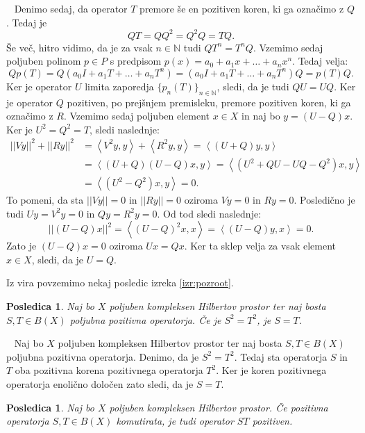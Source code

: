 \documentclass[12pt,a4paper,oneside,fleqn,openany]{book}
\newtheorem{posledica}[izrek]{Posledica}
\newcommand{\eopf}{\raisebox{0.8ex}{\framebox{}}} %
\newenvironment{dokaz}%
{\noindent{\bf Dokaz.}\ }%
{\hfill\eopf\par\bigskip}%
\newcommand{\N}{\mathbb{N}}
\newcommand{\abs}[1]{\ensuremath{\lvert #1 \rvert}}
\newcommand{\norm}[1]{\abs{\abs{#1}}}
\newcommand{\Sp}[2]{\ensuremath{\left<#1, #2\right>}}
\begin{document}
\begin{dokaz}
	Denimo sedaj, da operator $T$ premore še en pozitiven koren, ki ga označimo z $Q$. Tedaj je $$QT = QQ^2 = Q^2Q = TQ.$$ Še več, hitro vidimo, da je za vsak $n\in\N$ tudi $QT^n = T^nQ$. Vzemimo sedaj poljuben polinom $p\in P$ s predpisom $p(x) = a_0 + a_1x + \ldots + a_nx^n$. Tedaj velja: $$Qp(T) = Q(a_0I + a_1T + \ldots + a_nT^n) = (a_0I + a_1T + \ldots + a_nT^n)Q = p(T)Q.$$ Ker je operator $U$ limita zaporedja $\{p_n(T)\}_{n\in\N}$, sledi, da je tudi $QU = UQ$. Ker je operator $Q$ pozitiven, po prejšnjem premisleku, premore pozitiven koren, ki ga označimo z $R$. Vzemimo sedaj poljuben element $x\in X$ in naj bo $y = (U-Q)x$. Ker je $U^2 = Q^2 = T$, sledi naslednje: \begin{align*}
		\norm{Vy}^2 + \norm{Ry}^2 &= \Sp{V^2y}{y} + \Sp{R^2y}{y} = \Sp{(U+Q)y}{y} \\
		&= \Sp{(U + Q)(U-Q)x}{y} = \Sp{(U^2 + QU - UQ - Q^2)x}{y} \\
		&= \Sp{(U^2 - Q^2)x}{y} = 0.
	\end{align*}
	To pomeni, da sta $\norm{Vy}=0$ in $\norm{Ry}=0$ oziroma $Vy = 0$ in $Ry = 0$. Posledično je tudi $Uy = V^2y = 0$ in $Qy = R^2y = 0$. Od tod sledi naslednje: $$\norm{(U-Q)x}^2=\Sp{(U-Q)^2x}{x} = \Sp{(U-Q)y}{x} =0.$$ Zato je $(U-Q)x=0$ oziroma $Ux = Qx$. Ker ta sklep velja za vsak element $x\in X$, sledi, da je $U=Q$.
\end{dokaz}

Iz vira \cite{bib:Kurepa} povzemimo nekaj posledic izreka \ref{izr:pozroot}.

\begin{posledica}
	\label{posl:pozopkvadrat}
	Naj bo $X$ poljuben kompleksen Hilbertov prostor ter naj bosta $S, T\in B(X)$ poljubna pozitivna operatorja. Če je $S^2 = T^2$, je $S=T$.
\end{posledica}
\begin{dokaz}
	Naj bo $X$ poljuben kompleksen Hilbertov prostor ter naj bosta $S, T\in B(X)$ poljubna pozitivna operatorja. Denimo, da je $S^2 = T^2$. Tedaj sta operatorja $S$ in $T$ oba pozitivna korena pozitivnega operatorja $T^2$. Ker je koren pozitivnega operatorja enolično določen zato sledi, da je $S=T$.
\end{dokaz}

\begin{posledica}
	\label{posl:pozprod} 
	Naj bo $X$ poljuben kompleksen Hilbertov prostor. Če pozitivna operatorja $S, T\in B(X)$ komutirata, je tudi operator $ST$ pozitiven.
\end{posledica}
\end{document}
